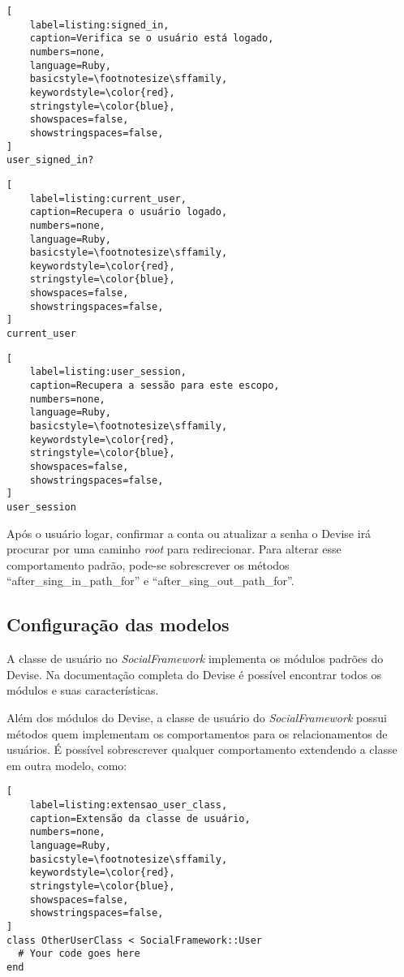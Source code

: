 \begin{lstlisting}[
    label=listing:signed_in,
    caption=Verifica se o usuário está logado,
    numbers=none,
    language=Ruby,
    basicstyle=\footnotesize\sffamily,
    keywordstyle=\color{red},
    stringstyle=\color{blue},
    showspaces=false,
    showstringspaces=false,
]
user_signed_in?
\end{lstlisting}

\begin{lstlisting}[
    label=listing:current_user,
    caption=Recupera o usuário logado,
    numbers=none,
    language=Ruby,
    basicstyle=\footnotesize\sffamily,
    keywordstyle=\color{red},
    stringstyle=\color{blue},
    showspaces=false,
    showstringspaces=false,
]
current_user
\end{lstlisting}

\begin{lstlisting}[
    label=listing:user_session,
    caption=Recupera a sessão para este escopo,
    numbers=none,
    language=Ruby,
    basicstyle=\footnotesize\sffamily,
    keywordstyle=\color{red},
    stringstyle=\color{blue},
    showspaces=false,
    showstringspaces=false,
]
user_session
\end{lstlisting}

Após o usuário logar, confirmar a conta ou atualizar a senha o Devise irá procurar por uma caminho \textit{root} para redirecionar. Para alterar esse comportamento padrão, pode-se sobrescrever os métodos ``after\_sing\_in\_path\_for'' e ``after\_sing\_out\_path\_for''.

\subsection{Configuração das modelos}
\label{configuracao_das_modelos}

A classe de usuário no \textit{SocialFramework} implementa os módulos padrões do Devise. Na documentação completa do Devise é possível encontrar todos os módulos e suas características.

Além dos módulos do Devise, a classe de usuário do \textit{SocialFramework} possui métodos quem implementam os comportamentos para os relacionamentos de usuários. É possível sobrescrever qualquer comportamento extendendo a classe em outra modelo, como:

\begin{lstlisting}[
    label=listing:extensao_user_class,
    caption=Extensão da classe de usuário,
    numbers=none,
    language=Ruby,
    basicstyle=\footnotesize\sffamily,
    keywordstyle=\color{red},
    stringstyle=\color{blue},
    showspaces=false,
    showstringspaces=false,
]
class OtherUserClass < SocialFramework::User
  # Your code goes here
end
\end{lstlisting}

